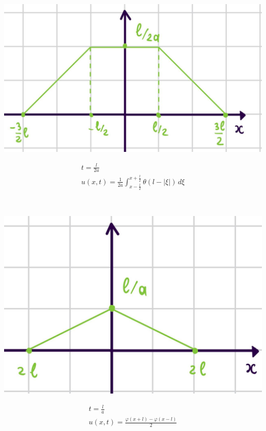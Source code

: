     \begin{minipage}{0.4\textwidth}
  \includegraphics[width=1\linewidth]{pictures/u7.jpg} 
    \end{minipage}
    \begin{minipage}{0.4\textwidth}\raggedleft
      \begin{gather*}
        t = \frac{l}{2a} \\
        u(x,t) = \frac{1}{2a} \int_{x- \frac{l}{2}}^{x + \frac{l}{2}} \theta(l -|\xi| )\,d\xi
      \end{gather*}
    \end{minipage} \\
    \begin{minipage}{0.4\textwidth}
  \includegraphics[width=1\linewidth]{pictures/u8.jpg} 
    \end{minipage}
    \begin{minipage}{0.4\textwidth}\raggedleft
      \begin{gather*}
        t = \frac{l}{a} \\
        u(x,t) = \frac{\varphi(x+ l)- \varphi(x -l)}{2} \\
      \end{gather*}
    \end{minipage} \\
